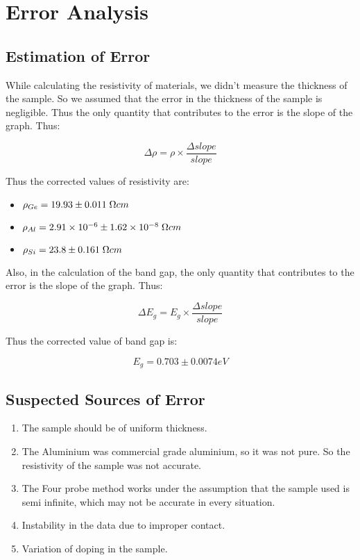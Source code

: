 \section{Error Analysis}
	\subsection{Estimation of Error}
		While calculating the resistivity of materials, we didn't measure the thickness of the sample. So we assumed that the error in the thickness of the sample is negligible. Thus the only quantity that contributes to the error is the slope of the graph. Thus:

		$$\Delta\rho = \rho\times\frac{\Delta slope}{slope}$$

		Thus the corrected values of resistivity are:
		\begin{itemize}
			\item $\rho_{Ge} = 19.93\pm0.011\;\ohm cm$
			\item $\rho_{Al} = 2.91\times10^{-6}\pm1.62\times10^{-8}\;\ohm cm$
			\item $\rho_{Si} = 23.8\pm0.161\;\ohm cm$
		\end{itemize}

		Also, in the calculation of the band gap, the only quantity that contributes to the error is the slope of the graph. Thus:

		$$\Delta E_g = E_g\times\frac{\Delta slope}{slope}$$

		Thus the corrected value of band gap is:

		$$E_g = 0.703\pm0.0074eV$$

	\subsection{Suspected Sources of Error}
		\begin{enumerate}
			\item The sample should be of uniform thickness.
			\item The Aluminium was commercial grade aluminium, so it was not pure. So the resistivity of the sample was not accurate.
			\item The Four probe method works under the assumption that the sample used is semi infinite, which may not be accurate in every situation.
			\item Instability in the data due to improper contact.
			\item Variation of doping in the sample.
		\end{enumerate}
		
